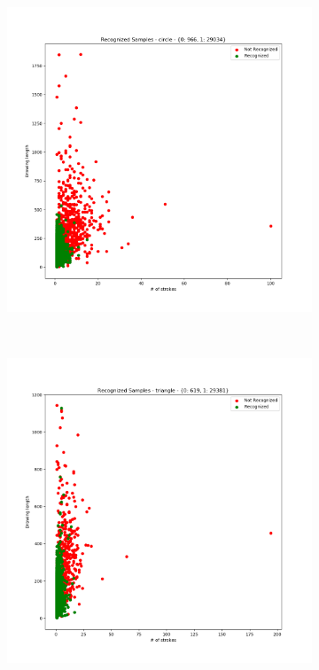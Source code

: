 \begin{figure}
    \centering
    \begin{subfigure}{0.3\textwidth}
        \includegraphics[scale=0.28]{images/dataset/recog_circle.png}
    \end{subfigure}
    ~
    \begin{subfigure}{0.3\textwidth}
        \includegraphics[scale=0.28]{images/dataset/recog_triangle.png}

\end{subfigure}
\end{figure}
